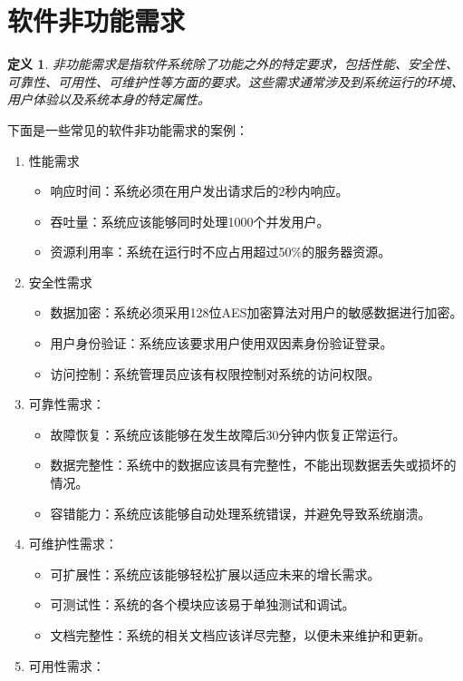 \documentclass[11pt, a4paper, oneside]{ctexbook}
\newtheorem{definition}[theorem]{定义}
\begin{document}
\section{软件非功能需求}
\begin{definition}
    非功能需求是指软件系统除了功能之外的特定要求，包括性能、安全性、可靠性、可用性、可维护性等方面的要求。这些需求通常涉及到系统运行的环境、用户体验以及系统本身的特定属性。
\end{definition}
下面是一些常见的软件非功能需求的案例：
\begin{enumerate}[itemsep=10pt,parsep=0pt,partopsep=0pt,topsep=0pt]
    \item 性能需求
    
    \begin{itemize}[itemsep=0pt,parsep=0pt,partopsep=0pt,topsep=0pt]
        \item 响应时间：系统必须在用户发出请求后的2秒内响应。
        \item 吞吐量：系统应该能够同时处理1000个并发用户。
        \item 资源利用率：系统在运行时不应占用超过50\%的服务器资源。
    \end{itemize}
    \item 安全性需求
    
    \begin{itemize}[itemsep=0pt,parsep=0pt,partopsep=0pt,topsep=0pt]
        \item 数据加密：系统必须采用128位AES加密算法对用户的敏感数据进行加密。
        \item 用户身份验证：系统应该要求用户使用双因素身份验证登录。
        \item 访问控制：系统管理员应该有权限控制对系统的访问权限。
    \end{itemize}
    \item 可靠性需求：
    
    \begin{itemize}[itemsep=0pt,parsep=0pt,partopsep=0pt,topsep=0pt]
        \item 故障恢复：系统应该能够在发生故障后30分钟内恢复正常运行。
        \item 数据完整性：系统中的数据应该具有完整性，不能出现数据丢失或损坏的情况。
        \item 容错能力：系统应该能够自动处理系统错误，并避免导致系统崩溃。
    \end{itemize}
    \item 可维护性需求：
    
    \begin{itemize}[itemsep=0pt,parsep=0pt,partopsep=0pt,topsep=0pt]
        \item 可扩展性：系统应该能够轻松扩展以适应未来的增长需求。
        \item 可测试性：系统的各个模块应该易于单独测试和调试。
        \item 文档完整性：系统的相关文档应该详尽完整，以便未来维护和更新。
    \end{itemize}
    \item 可用性需求：
    

\end{enumerate}
\end{document}
